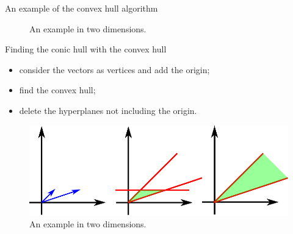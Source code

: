 \begin{frame}{An example of the convex hull algorithm}
\begin{figure}
\caption{An example in two dimensions.}
\end{figure}
\end{frame}

\begin{frame}{Finding the conic hull with the convex hull}
\begin{itemize}
\item consider the vectors as vertices and add the origin;
\item find the convex hull;
\item delete the hyperplanes not including the origin.
\end{itemize}
\begin{figure}
\includegraphics[scale=1]{images/conehull.eps}
\caption{An example in two dimensions.}
\end{figure}
\end{frame}

